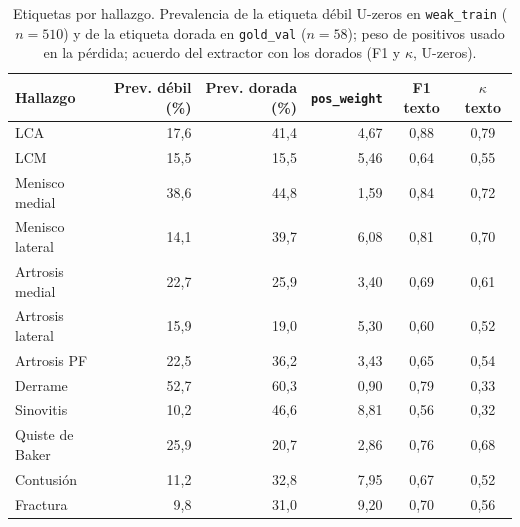 \begin{table}[t]
  \caption{Etiquetas por hallazgo. Prevalencia de la etiqueta débil U-zeros en
    \texttt{weak\_train} ($n=510$) y de la etiqueta dorada en \texttt{gold\_val} ($n=58$);
    peso de positivos usado en la pérdida; acuerdo del extractor con los dorados (F1 y
    $\kappa$, U-zeros).}
  \label{tab:etiquetas}
  \centering
  \small
  \begin{tabular}{lrrrcc}
    \toprule
    Hallazgo & Prev. débil (\%) & Prev. dorada (\%) & \texttt{pos\_weight} & F1 texto & $\kappa$ texto \\
    \midrule
    LCA               & 17,6 & 41,4 & 4,67 & 0,88 & 0,79 \\
    LCM               & 15,5 & 15,5 & 5,46 & 0,64 & 0,55 \\
    Menisco medial    & 38,6 & 44,8 & 1,59 & 0,84 & 0,72 \\
    Menisco lateral   & 14,1 & 39,7 & 6,08 & 0,81 & 0,70 \\
    Artrosis medial   & 22,7 & 25,9 & 3,40 & 0,69 & 0,61 \\
    Artrosis lateral  & 15,9 & 19,0 & 5,30 & 0,60 & 0,52 \\
    Artrosis PF       & 22,5 & 36,2 & 3,43 & 0,65 & 0,54 \\
    Derrame           & 52,7 & 60,3 & 0,90 & 0,79 & 0,33 \\
    Sinovitis         & 10,2 & 46,6 & 8,81 & 0,56 & 0,32 \\
    Quiste de Baker   & 25,9 & 20,7 & 2,86 & 0,76 & 0,68 \\
    Contusión         & 11,2 & 32,8 & 7,95 & 0,67 & 0,52 \\
    Fractura          &  9,8 & 31,0 & 9,20 & 0,70 & 0,56 \\
    \bottomrule
  \end{tabular}
\end{table}
